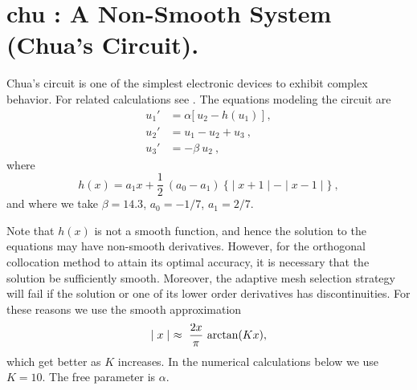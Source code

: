 \documentclass[12pt]{report}
\def\abs#1{\mid#1\mid}
\begin{document}
\section{ chu :  A Non-Smooth System (Chua's Circuit).} \label{sec:Demos_chu}
Chua's circuit 
is one of the simplest electronic devices to exhibit complex behavior. 
For related calculations see
 \citeyear{KhRoCh:93}.
The equations modeling the circuit are
\begin{equation} \begin{array}{cl}
 u_1' &=  \alpha \bigl[~ u_2 - h(u_1) ~\bigr]~,\\ 
 u_2' &=  u_1 - u_2 + u_3~, \\  
 u_3' &=  - \beta~ u_2~,  
\end{array} \end{equation}
where
$$ h(x) = a_1 x + \frac{1}{2}~ (a_0 - a_1) ~
  \bigl\{ \abs{x+1} -  \abs{x-1} \bigr\}~,$$
and where we take
$\beta = 14.3$, $a_0 = - 1/7$, $a_1 = 2/7$.

Note that $h(x)$ is not a smooth function, and hence the solution 
to the equations  may have non-smooth derivatives.
However, for the orthogonal collocation method to attain its optimal accuracy,
it is necessary that the solution be sufficiently smooth.
Moreover, the adaptive mesh selection strategy will fail
if the solution or one of its lower order derivatives has discontinuities.
For these reasons  we use the smooth approximation
$$ \abs{x} ~\approx~ \frac{2 x}{\pi } ~ {\rm arctan}(Kx),$$
which get better as $K$ increases.
In the numerical calculations below we use $K = 10$.
The free parameter is $\alpha$.
\end{document}
